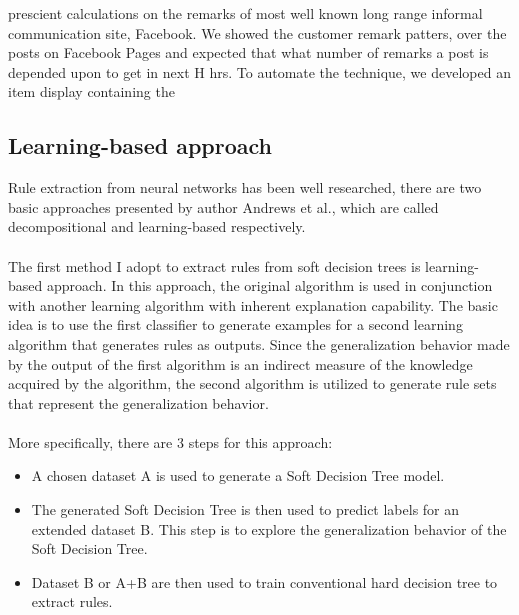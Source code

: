 \documentclass[12pt]{article}%
\begin{document}
prescient calculations on the remarks of most well known long range informal communication site, Facebook. We showed the customer remark patters, over the posts on Facebook Pages and expected that what number of remarks a post is depended upon to get in next H hrs. To automate the technique, we developed an item display containing the


\subsection{Learning-based approach}
Rule extraction from neural networks has been well researched, there are two basic approaches presented by author Andrews et al.\cite{andrews1995survey}, which are called decompositional and learning-based respectively. 
\\\\
The first method I adopt to extract rules from soft decision trees is learning-based approach. In this approach, the original algorithm is used in conjunction with another learning algorithm with inherent explanation capability. The basic idea is to use the first classifier to generate examples for a second learning algorithm that generates rules as outputs. Since the generalization behavior made by the output of the first algorithm is an indirect measure of the knowledge acquired by the algorithm, the second algorithm is utilized to generate rule sets that represent the generalization behavior\cite{barakat2004learning,123}.
\\\\
More specifically, there are 3 steps for this approach:
\begin{itemize}
\item A chosen dataset A is used to generate a Soft Decision Tree model.
\item The generated Soft Decision Tree is then used to predict labels for an extended dataset B. This step is to explore the
generalization behavior of the Soft Decision Tree. 
\item Dataset B or A+B are then used to train conventional hard decision tree to extract rules.
\end{itemize}
\end{document}
